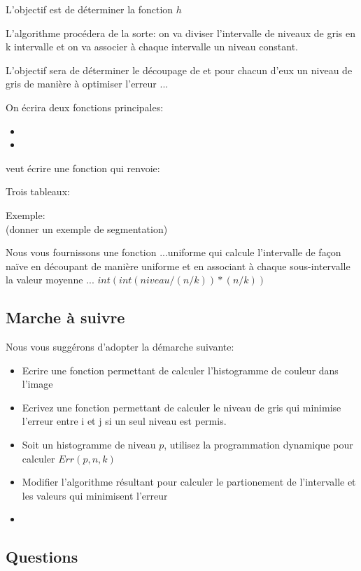 \documentclass[a4paper,10pt]{article}
\begin{document}
L'objectif est de déterminer la fonction $h$ 

L'algorithme procédera de la sorte: on va diviser l'intervalle de niveaux de gris en k intervalle et on va associer à chaque intervalle un niveau constant.

L'objectif sera de déterminer le découpage de et pour chacun d'eux un niveau de gris de manière à optimiser l'erreur ...

On écrira deux fonctions principales:
\begin{itemize}
\item 
\item 
\end{itemize}

veut écrire une fonction qui renvoie:

Trois tableaux:

Exemple:\\
(donner un exemple de segmentation)

Nous vous fournissons une fonction ...uniforme qui calcule
l'intervalle de façon naïve en découpant de manière uniforme et en
associant à chaque sous-intervalle la valeur moyenne ...
$int( int(niveau/(n/k)) * (n/k))$

\subsection*{Marche à suivre}

Nous vous suggérons d'adopter la démarche suivante:
\begin{itemize}
\item Ecrire une fonction permettant de calculer l'histogramme de couleur dans l'image
\item Ecrivez une fonction permettant de calculer le niveau de gris qui minimise l'erreur entre i et j si un seul
  niveau est permis.
\item Soit un histogramme de niveau $p$, utilisez la programmation dynamique pour calculer $Err(p,n,k)$
\item Modifier l'algorithme résultant pour calculer le partionement de l'intervalle et les valeurs qui minimisent l'erreur
\item 
\end{itemize}

\subsection*{Questions}
\end{document}
